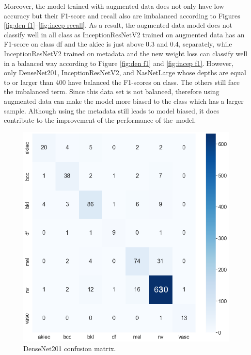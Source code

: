 \documentclass[sensors,article,accept,pdftex,moreauthors]{Definitions/mdpi}
\begin{document}
	Moreover, the model trained with augmented data does not only have low accuracy but their F1-score and recall also are imbalanced according to Figures \ref{fig:den f1}--\ref{fig:incep recall}. As a result, the augmented data model does not classify well in all class as InceptionResNetV2 trained on augmented data has an F1-score on class df and the akiec is just above $0.3$ and $0.4$, separately, while InceptionResNetV2 trained on metadata and the new weight loss can classify well in a balanced way according to Figure \ref{fig:den f1} and \ref{fig:incep f1}. However, only DenseNet201, InceptionResNetV2, and NasNetLarge whose depths are equal to or larger than 400 have balanced the F1-scores on class. The others still face the imbalanced term. Since this data set is not balanced, therefore using augmented data can make the model more biased to the class which has a larger sample. Although using the metadata still leads to model biased, it does contribute to the improvement of the performance of the~model.
	
	\begin{figure}[H]
		\begin{minipage}{0.48\textwidth}
\centering
\includegraphics[width=1\linewidth]{Definitions/CM/dn201cm}
		\end{minipage}
\caption{{DenseNet201} %
 confusion matrix.}\label{fig:densenet201cm}
		\end{figure}\unskip
		
\end{document}
